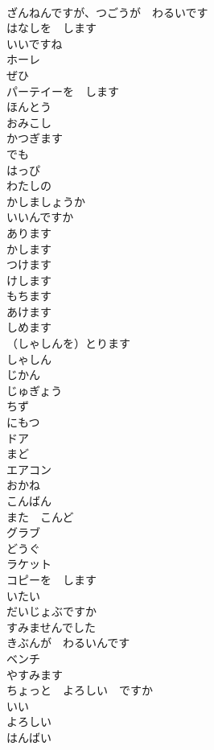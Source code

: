 \documentclass[8pt]{extreport}
\begin{document}
\begin{CJK}{UTF8}{min}
\\	ざんねんですが、つごうが　わるいです		
\\	はなしを　します		
\\	いいですね		
\\	ホーレ		
\\	ぜひ		
\\	パーテイーを　します		
\\	ほんとう		
\\	おみこし		
\\	かつぎます		
\\	でも		
\\	はっぴ		
\\	わたしの		
\\	かしましょうか		
\\	いいんですか		
\\	あります		
\\	かします		
\\	つけます		
\\	けします		
\\	もちます		
\\	あけます		
\\	しめます		
\\	（しゃしんを）とります		
\\	しゃしん		
\\	じかん		
\\	じゅぎょう		
\\	ちず		
\\	にもつ		
\\	ドア		
\\	まど		
\\	エアコン		
\\	おかね		
\\	こんばん		
\\	また　こんど		
\\	グラブ		
\\	どうぐ		
\\	ラケット		
\\	コピーを　します		
\\	いたい		
\\	だいじょぶですか		
\\	すみませんでした		
\\	きぶんが　わるいんです		
\\	ベンチ		
\\	やすみます		
\\	ちょっと　よろしい　ですか		
\\	いい 
\\	よろしい		
\\	はんばい		

\end{CJK}
\end{document}
